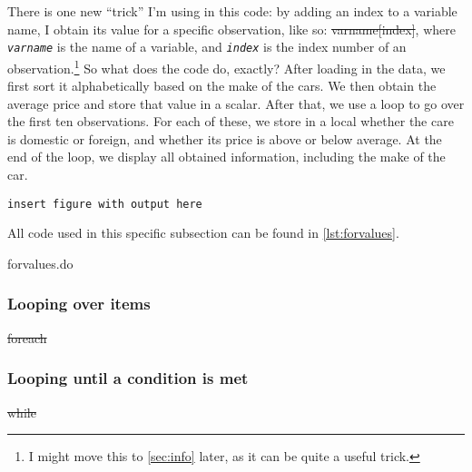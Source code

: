 There is one new ``trick'' I'm using in this code:
by adding an index to a variable name, I obtain its value for a specific observation,
like so: \st{varname[index]},
where \textit{\texttt{varname}} is the name of a variable,
and \textit{\texttt{index}} is the index number of an observation.\footnote{%
I might move this to \cref{sec:info} later, as it can be quite a useful trick.}
So what does the code do, exactly?
After loading in the data,
we first sort it alphabetically based on the make of the cars.
We then obtain the average price and store that value in a scalar.
After that, we use a loop to go over the first ten observations.
For each of these, we store in a local whether the care is domestic or foreign,
and whether its price is above or below average.
At the end of the loop,
we display all obtained information, including the make of the car.

\begin{center}\texttt{insert figure with output here}\end{center}

All code used in this specific subsection can be found in \cref{lst:forvalues}.

\begin{listing}[tbp]
\caption{forvalues.do}\label{lst:forvalues}
\end{listing}

\subsubsection{Looping over items}

\st{foreach}

\subsubsection{Looping until a condition is met}

\st{while}
